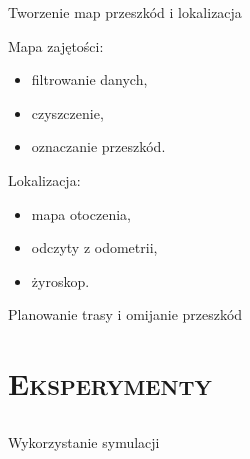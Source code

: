 \documentclass[xcolor=x11names,compress]{beamer}
\renewcommand{\(}{\begin{columns}}
\renewcommand{\)}{\end{columns}}
\newcommand{\<}[1]{\begin{column}{#1}}
\renewcommand{\>}{\end{column}}
\begin{document}
\begin{frame}{Tworzenie map przeszkód i lokalizacja}

\alert{Mapa zajętości:}
\begin{itemize}
\item filtrowanie danych,
\item czyszczenie,
\item oznaczanie przeszkód.
\end{itemize}

\vspace{1cm}

\alert{Lokalizacja:}
\begin{itemize}
\item mapa otoczenia,
\item odczyty z odometrii,
\item żyroskop.
\end{itemize}

\end{frame}

\begin{frame}{Planowanie trasy i omijanie przeszkód}

\end{frame}

\section{\scshape Eksperymenty}

\subsection*{}
\begin{frame}{Wykorzystanie symulacji}

\end{frame}
\end{document}
